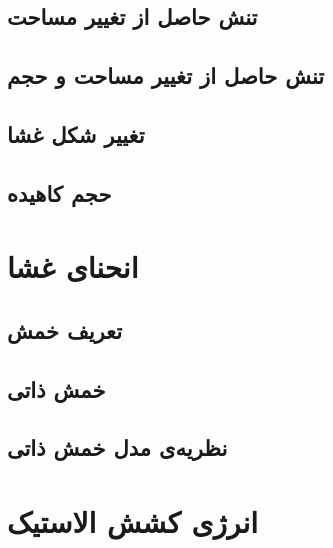 \setRL
\clearpage

\def \MemTB {\Mempath /MembraneTheoreticalBackground}


\subsection{
تنش حاصل از تغییر مساحت
}

\subsection{
تنش حاصل از تغییر مساحت و حجم
}

\subsection{
تغییر شکل غشا
}

\subsection{
حجم کاهیده
}



\section{
انحنای غشا
}
\subsection{
تعریف خمش
}


\subsection{
خمش ذاتی
}


\subsection{
نظریه‌ی مدل خمش ذاتی
\label{sec:spontaneousCurvatureModel}
}



\section{
انرژی کشش الاستیک
}











